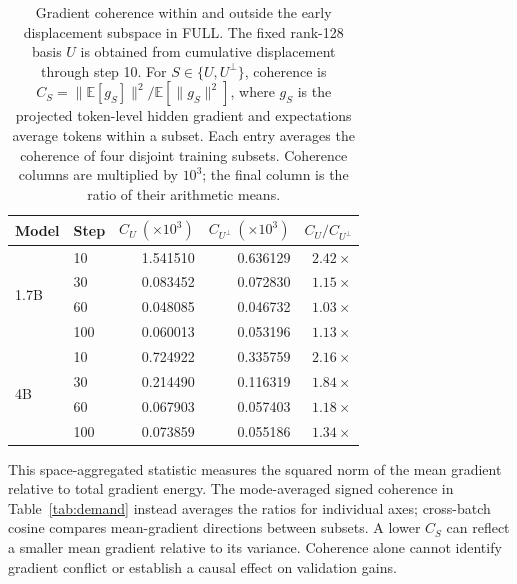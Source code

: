 \begin{table}[!htbp]
\centering
\caption{Gradient coherence within and outside the early displacement subspace in FULL. The fixed rank-128 basis $U$ is obtained from cumulative displacement through step 10. For $S\in\{U,U^\perp\}$, coherence is $C_S=\|\mathbb E[g_S]\|^2/\mathbb E[\|g_S\|^2]$, where $g_S$ is the projected token-level hidden gradient and expectations average tokens within a subset. Each entry averages the coherence of four disjoint training subsets. Coherence columns are multiplied by $10^3$; the final column is the ratio of their arithmetic means.}
\label{tab:space_coherence}
\small
\setlength{\tabcolsep}{8pt}
\begin{tabular}{llrrr}
\toprule
Model & Step & $C_U\ (\times10^3)$ & $C_{U^\perp}\ (\times10^3)$ & $C_U/C_{U^\perp}$ \\
\midrule
\multirow{4}{*}{1.7B} & 10 & 1.541510 & 0.636129 & $2.42\times$ \\
 & 30 & 0.083452 & 0.072830 & $1.15\times$ \\
 & 60 & 0.048085 & 0.046732 & $1.03\times$ \\
 & 100 & 0.060013 & 0.053196 & $1.13\times$ \\
\midrule
\multirow{4}{*}{4B} & 10 & 0.724922 & 0.335759 & $2.16\times$ \\
 & 30 & 0.214490 & 0.116319 & $1.84\times$ \\
 & 60 & 0.067903 & 0.057403 & $1.18\times$ \\
 & 100 & 0.073859 & 0.055186 & $1.34\times$ \\
\bottomrule
\end{tabular}
\par\smallskip
\begin{minipage}{0.96\textwidth}\footnotesize
This space-aggregated statistic measures the squared norm of the mean gradient relative to total gradient energy. The mode-averaged signed coherence in Table~\ref{tab:demand} instead averages the ratios for individual axes; cross-batch cosine compares mean-gradient directions between subsets. A lower $C_S$ can reflect a smaller mean gradient relative to its variance. Coherence alone cannot identify gradient conflict or establish a causal effect on validation gains.
\end{minipage}
\end{table}

